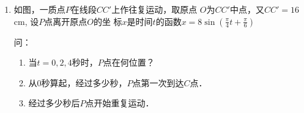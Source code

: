 \begin{enumerate}
\item 如图，一质点$P$在线段$CC'$上作往复运动，取原点
$O$为$CC'$中点，又$CC'=16$cm, 设$P$点离开原点$O$的坐
标$x$是时间$t$的函数$x=8\sin\left(\frac{\pi}{4}t+\frac{\pi}{6}\right)$
\begin{center}
\end{center}
问： \begin{enumerate}
\item 当$t=0, 2, 4$秒时，$P$点在何位置？
\item 从0秒算起，经过多少秒，$P$点第一次到达$C$点．
\item 经过多少秒后$P$点开始重复运动．
\end{enumerate}


\end{enumerate}
